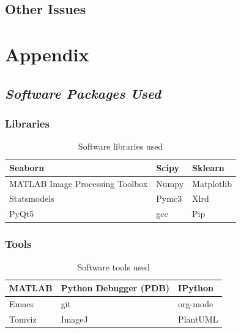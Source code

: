 \documentclass[11pt]{report}
\begin{document}
\section{Other Issues}
\label{sec:orgc86d25f}
\chapter{Appendix}
\label{sec:orga3cf9fe}
\section{\emph{Software Packages Used}}
\label{sec:orgafc4fc6}

\subsection{Libraries}
\label{sec:org5cba2a1}
\begin{table}[htbp]
\caption{\label{tab:orgf345857}
Software libraries used}
\centering
\begin{tabularx}{\textwidth}{|X|X|X|}
\hline
Seaborn & Scipy & Sklearn\\
\hline
MATLAB Image Processing Toolbox & Numpy & Matplotlib\\
\hline
Statsmodels & Pymc3 & Xlrd\\
\hline
PyQt5 & gcc & Pip\\
\hline
\end{tabularx}
\end{table}

\subsection{Tools}
\label{sec:orgba59485}
\begin{table}[htbp]
\caption{\label{tab:org4bccd04}
Software tools used}
\centering
\begin{tabularx}{\textwidth}{|X|X|X|}
\hline
MATLAB & Python Debugger (PDB) & IPython\\
\hline
Emacs & git & org-mode\\
\hline
Tomviz & ImageJ & PlantUML\\
\hline
\end{tabularx}
\end{table}

\clearpage
\end{document}
